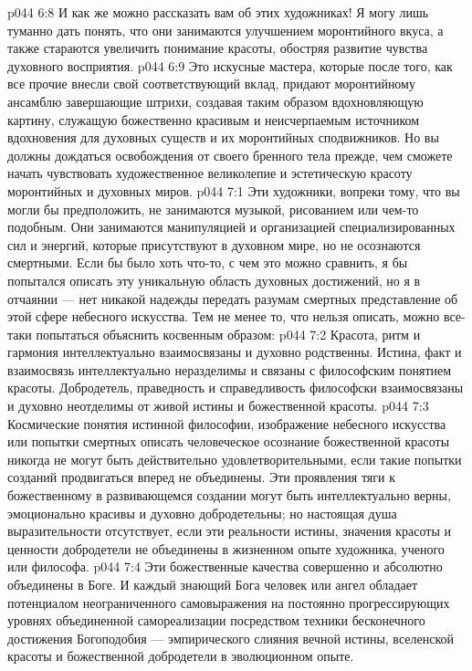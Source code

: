 \vs p044 6:8 \bibnobreakspace {} И как же можно рассказать вам об этих художниках! Я могу лишь туманно дать понять, что они занимаются улучшением моронтийного вкуса, а также стараются увеличить понимание красоты, обостряя развитие чувства духовного восприятия.
\vs p044 6:9 \bibnobreakspace {} Это искусные мастера, которые после того, как все прочие внесли свой соответствующий вклад, придают моронтийному ансамблю завершающие штрихи, создавая таким образом вдохновляющую картину, служащую божественно красивым и неисчерпаемым источником вдохновения для духовных существ и их моронтийных сподвижников. Но вы должны дождаться освобождения от своего бренного тела прежде, чем сможете начать чувствовать художественное великолепие и эстетическую красоту моронтийных и духовных миров.
\vs p044 7:1 Эти художники, вопреки тому, что вы могли бы предположить, не занимаются музыкой, рисованием или чем\hyp{}то подобным. Они занимаются манипуляцией и организацией специализированных сил и энергий, которые присутствуют в духовном мире, но не осознаются смертными. Если бы было хоть что\hyp{}то, с чем это можно сравнить, я бы попытался описать эту уникальную область духовных достижений, но я в отчаянии --- нет никакой надежды передать разумам смертных представление об этой сфере небесного искусства. Тем не менее то, что нельзя описать, можно все\hyp{}таки попытаться объяснить косвенным образом:
\vs p044 7:2 Красота, ритм и гармония интеллектуально взаимосвязаны и духовно родственны. Истина, факт и взаимосвязь интеллектуально неразделимы и связаны с философским понятием красоты. Добродетель, праведность и справедливость философски взаимосвязаны и духовно неотделимы от живой истины и божественной красоты.
\vs p044 7:3 Космические понятия истинной философии, изображение небесного искусства или попытки смертных описать человеческое осознание божественной красоты никогда не могут быть действительно удовлетворительными, если такие попытки созданий продвигаться вперед не объединены. Эти проявления тяги к божественному в развивающемся создании могут быть интеллектуально верны, эмоционально красивы и духовно добродетельны; но настоящая душа выразительности отсутствует, если эти реальности истины, значения красоты и ценности добродетели не объединены в жизненном опыте художника, ученого или философа.
\vs p044 7:4 Эти божественные качества совершенно и абсолютно объединены в Боге. И каждый знающий Бога человек или ангел обладает потенциалом неограниченного самовыражения на постоянно прогрессирующих уровнях объединенной самореализации посредством техники бесконечного достижения Богоподобия --- эмпирического слияния вечной истины, вселенской красоты и божественной добродетели в эволюционном опыте.
